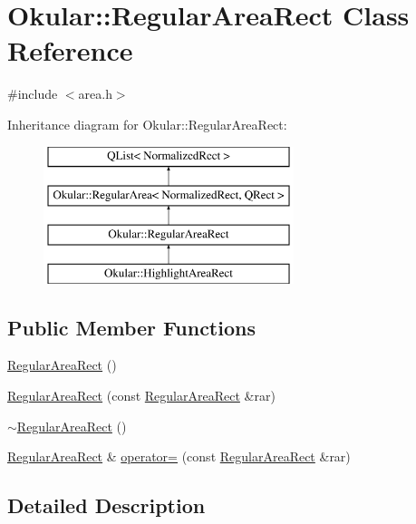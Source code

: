 \hypertarget{classOkular_1_1RegularAreaRect}{\section{Okular\+:\+:Regular\+Area\+Rect Class Reference}
\label{classOkular_1_1RegularAreaRect}
}


{\ttfamily \#include $<$area.\+h$>$}

Inheritance diagram for Okular\+:\+:Regular\+Area\+Rect\+:\begin{figure}[H]
\begin{center}
\leavevmode
\includegraphics[height=4.000000cm]{classOkular_1_1RegularAreaRect}
\end{center}
\end{figure}
\subsection*{Public Member Functions}
\begin{DoxyCompactItemize}
\item 
\hyperlink{classOkular_1_1RegularAreaRect_aa39db1ba63d1eeb0a26f8364f8a18711}{Regular\+Area\+Rect} ()
\item 
\hyperlink{classOkular_1_1RegularAreaRect_a63f02706eca5f585b0ef67225d1bbdc8}{Regular\+Area\+Rect} (const \hyperlink{classOkular_1_1RegularAreaRect}{Regular\+Area\+Rect} \&rar)
\item 
\hyperlink{classOkular_1_1RegularAreaRect_a90b0d805efe1b08a3f73b6e4085180ba}{$\sim$\+Regular\+Area\+Rect} ()
\item 
\hyperlink{classOkular_1_1RegularAreaRect}{Regular\+Area\+Rect} \& \hyperlink{classOkular_1_1RegularAreaRect_ae228e58ed74deccce10afc982bed0c94}{operator=} (const \hyperlink{classOkular_1_1RegularAreaRect}{Regular\+Area\+Rect} \&rar)
\end{DoxyCompactItemize}


\subsection{Detailed Description}


